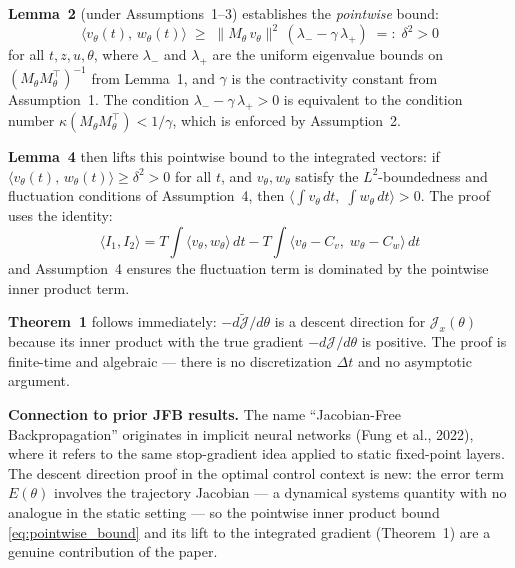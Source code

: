 \documentclass{article}
\begin{document}
\begin{mathrequirementsbox}
\textbf{Lemma~2} (under Assumptions~1--3) establishes the \textit{pointwise} bound:
\begin{equation}
    \langle v_\theta(t),\, w_\theta(t) \rangle
    \;\geq\; \|M_\theta\, v_\theta\|^2\,(\lambda_- - \gamma\,\lambda_+)
    \;=:\; \delta^2 > 0
    \label{eq:pointwise_bound}
\end{equation}
for all $t, z, u, \theta$, where $\lambda_-$ and $\lambda_+$ are the
uniform eigenvalue bounds on $(M_\theta M_\theta^\top)^{-1}$ from Lemma~1,
and $\gamma$ is the contractivity constant from Assumption~1. The condition
$\lambda_- - \gamma\,\lambda_+ > 0$ is equivalent to the condition number
$\kappa(M_\theta M_\theta^\top) < 1/\gamma$, which is enforced by
Assumption~2.

\textbf{Lemma~4} then lifts this pointwise bound to the integrated vectors:
if $\langle v_\theta(t),\, w_\theta(t)\rangle \geq \delta^2 > 0$ for all
$t$, and $v_\theta, w_\theta$ satisfy the $L^2$-boundedness and fluctuation
conditions of Assumption~4, then
$\bigl\langle \int v_\theta\, dt,\; \int w_\theta\, dt \bigr\rangle > 0$.
The proof uses the identity:
\begin{equation}
    \langle I_1, I_2 \rangle
    = T \int \langle v_\theta, w_\theta\rangle\, dt
    - T \int \langle v_\theta - C_v,\; w_\theta - C_w\rangle\, dt
\end{equation}
and Assumption~4 ensures the fluctuation term is dominated by the
pointwise inner product term.

\textbf{Theorem~1} follows immediately: $-d\widetilde{\mathcal{J}}/d\theta$
is a descent direction for $\mathcal{J}_x(\theta)$ because its inner product
with the true gradient $-d\mathcal{J}/d\theta$ is positive. The proof is
finite-time and algebraic --- there is no discretization $\Delta t$ and no
asymptotic argument.

\textbf{Connection to prior JFB results.} The name ``Jacobian-Free
Backpropagation'' originates in implicit neural networks (Fung et al., 2022),
where it refers to the same stop-gradient idea applied to static
fixed-point layers. The descent direction proof in the optimal control
context is new: the error term $E(\theta)$ involves the trajectory
Jacobian --- a dynamical systems quantity with no analogue in the static
setting --- so the pointwise inner product bound \eqref{eq:pointwise_bound}
and its lift to the integrated gradient (Theorem~1) are a genuine
contribution of the paper.
\end{mathrequirementsbox}
\end{document}
